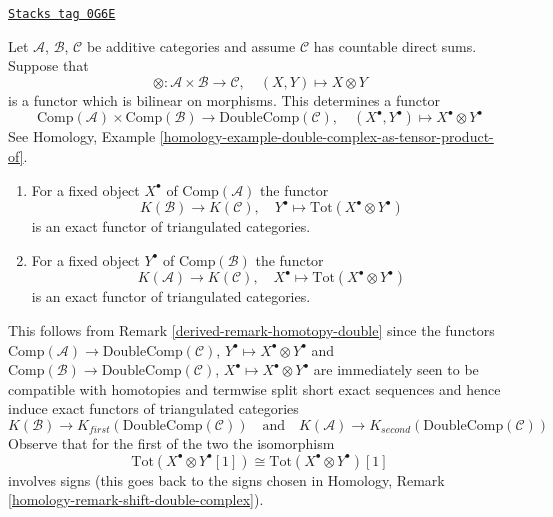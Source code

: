\begin{remark}
\label{derived-remark-double-complex-as-tensor-product-of}
\href{https://stacks.math.columbia.edu/tag/0G6E}{\texttt{Stacks tag 0G6E}}

Let $\mathcal{A}$, $\mathcal{B}$, $\mathcal{C}$ be additive categories
and assume $\mathcal{C}$ has countable direct sums. Suppose that
$$
\otimes : \mathcal{A} \times \mathcal{B} \longrightarrow \mathcal{C},
\quad
(X, Y) \longmapsto X \otimes Y
$$
is a functor which is bilinear on morphisms. This determines a functor
$$
\text{Comp}(\mathcal{A}) \times \text{Comp}(\mathcal{B})
\longrightarrow
\text{DoubleComp}(\mathcal{C}), \quad
(X^\bullet, Y^\bullet)
\longmapsto
X^\bullet \otimes Y^\bullet
$$
See
Homology, Example \ref{homology-example-double-complex-as-tensor-product-of}.
\begin{enumerate}
\item For a fixed object $X^\bullet$ of $\text{Comp}(\mathcal{A})$
the functor
$$
K(\mathcal{B}) \longrightarrow K(\mathcal{C}), \quad
Y^\bullet \longmapsto \text{Tot}(X^\bullet \otimes Y^\bullet)
$$
is an exact functor of triangulated categories.
\item For a fixed object $Y^\bullet$ of $\text{Comp}(\mathcal{B})$
the functor
$$
K(\mathcal{A}) \longrightarrow K(\mathcal{C}), \quad
X^\bullet \longmapsto \text{Tot}(X^\bullet \otimes Y^\bullet)
$$
is an exact functor of triangulated categories.
\end{enumerate}
This follows from Remark \ref{derived-remark-homotopy-double} since
the functors
$\text{Comp}(\mathcal{A}) \to \text{DoubleComp}(\mathcal{C})$,
$Y^\bullet \mapsto X^\bullet \otimes Y^\bullet$ and
$\text{Comp}(\mathcal{B}) \to \text{DoubleComp}(\mathcal{C})$,
$X^\bullet \mapsto X^\bullet \otimes Y^\bullet$
are immediately seen to be compatible with homotopies
and termwise split short exact sequences and hence induce
exact functors of triangulated categories
$$
K(\mathcal{B}) \to K_{first}(\text{DoubleComp}(\mathcal{C}))
\quad\text{and}\quad
K(\mathcal{A}) \to K_{second}(\text{DoubleComp}(\mathcal{C}))
$$
Observe that for the first of the two the isomorphism
$$
\text{Tot}(X^\bullet \otimes Y^\bullet[1]) \cong
\text{Tot}(X^\bullet \otimes Y^\bullet)[1]
$$
involves signs (this goes back to the signs chosen in
Homology, Remark \ref{homology-remark-shift-double-complex}).
\end{remark}

